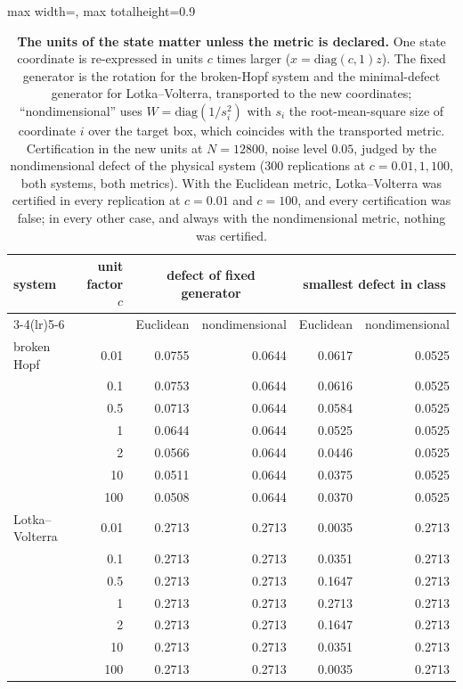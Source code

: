 \begin{table}[!htbp]
\centering\small
\begin{adjustbox}{max width=\textwidth, max totalheight=0.9\textheight}
\begin{tabular}{lrrrrr}
\toprule
system & unit factor $c$ & \multicolumn{2}{c}{defect of fixed generator} & \multicolumn{2}{c}{smallest defect in class} \\
\cmidrule(lr){3-4}\cmidrule(lr){5-6}
 & & Euclidean & nondimensional & Euclidean & nondimensional \\
\midrule
broken Hopf & 0.01 & 0.0755 & 0.0644 & 0.0617 & 0.0525 \\
 & 0.1 & 0.0753 & 0.0644 & 0.0616 & 0.0525 \\
 & 0.5 & 0.0713 & 0.0644 & 0.0584 & 0.0525 \\
 & 1 & 0.0644 & 0.0644 & 0.0525 & 0.0525 \\
 & 2 & 0.0566 & 0.0644 & 0.0446 & 0.0525 \\
 & 10 & 0.0511 & 0.0644 & 0.0375 & 0.0525 \\
 & 100 & 0.0508 & 0.0644 & 0.0370 & 0.0525 \\
\addlinespace
Lotka--Volterra & 0.01 & 0.2713 & 0.2713 & 0.0035 & 0.2713 \\
 & 0.1 & 0.2713 & 0.2713 & 0.0351 & 0.2713 \\
 & 0.5 & 0.2713 & 0.2713 & 0.1647 & 0.2713 \\
 & 1 & 0.2713 & 0.2713 & 0.2713 & 0.2713 \\
 & 2 & 0.2713 & 0.2713 & 0.1647 & 0.2713 \\
 & 10 & 0.2713 & 0.2713 & 0.0351 & 0.2713 \\
 & 100 & 0.2713 & 0.2713 & 0.0035 & 0.2713 \\
\bottomrule
\end{tabular}
\end{adjustbox}
\caption{\textbf{The units of the state matter unless the metric is declared.} One state coordinate is re-expressed in units $c$ times larger ($x = \mathrm{diag}(c,1)z$). The fixed generator is the rotation for the broken-Hopf system and the minimal-defect generator for Lotka--Volterra, transported to the new coordinates; ``nondimensional'' uses $W = \mathrm{diag}(1/s_i^2)$ with $s_i$ the root-mean-square size of coordinate $i$ over the target box, which coincides with the transported metric. Certification in the new units at $N = 12800$, noise level $0.05$, judged by the nondimensional defect of the physical system (300 replications at $c = 0.01, 1, 100$, both systems, both metrics). With the Euclidean metric, Lotka--Volterra was certified in every replication at $c = 0.01$ and $c = 100$, and every certification was false; in every other case, and always with the nondimensional metric, nothing was certified.}
\label{stab:units}
\end{table}
